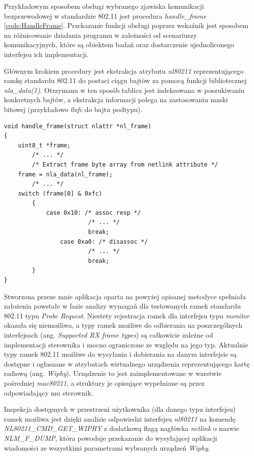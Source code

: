 Przykładowym sposobem obsługi wybranego zjawiska komunikacji bezprzewodowej w standardzie 802.11 jest procedura \emph{handle\_frame} \ref{code:HandleFrame}. Przekazanie funkcji obsługi poprzez wskaźnik jest sposobem na różnicowanie działania programu w zależności od scenariuszy komunikacyjnych, które są obiektem badań oraz dostarczenie ujednoliconego interfejsu ich implementacji. 

Głównym krokiem procedury jest ekstrakcja atrybutu \emph{nl80211} reprezentującego ramkę standardu 802.11 do postaci ciągu bajtów za pomocą funkcji bibliotecznej \emph{nla\_data(1)}. Otrzymana w ten sposób tablica jest indeksowana w poszukiwaniu konkretnych bajtów, a ekstrakcja informacji polega na zastosowaniu maski bitowej (przykładowo \emph{0xfc} do bajtu podtypu). 

\begin{lstlisting}[frame=tb]
void handle_frame(struct nlattr *nl_frame)
{
	uint8_t *frame;
        /* ... */
        /* Extract frame byte array from netlink attribute */
	frame = nla_data(nl_frame);
        /* ... */
	switch (frame[0] & 0xfc) 
        {
	        case 0x10: /* assoc resp */
                        /* ... */
                        break;
                case 0xa0: /* disassoc */
                        /* ... */
                        break;
        }
}
\end{lstlisting}

Stworzona przeze mnie aplikacja oparta na powyżej opisanej metodyce spełniała założenia powstałe w fazie analizy wymagań dla testowanych ramek standardu 802.11 typu \emph{Probe Request}. Niestety rejestracja ramek dla interfejsu typu \emph{monitor} okazała się niemożliwa, a typy ramek możliwe do odbierania na poszczególnych interfejsach (ang. \emph{Supported RX frame types}) są całkowicie zależne od implementacji sterownika i mocno ograniczone ze względu na jego typ. Aktualnie typy ramek 802.11 możliwe do wysyłania i dobierania na danym interfejsie są dostępne i ogłaszane w atrybutach wirtualnego urządzenia reprezentującego kartę radiową (ang. \emph{Wiphy}). Urządzenie to jest zaimplementowane w warstwie pośredniej \emph{mac80211}, a struktury je opisujące wypełniane są przez odpowiadający mu sterownik.

Inspekcja dostępnych w przestrzeni użytkownika (dla danego typu interfejsu) ramek możliwa jest dzięki analizie odpowiedzi interfejsu \emph{nl80211} na komendę \emph{NL80211\_CMD\_GET\_WIPHY} z dodatkową flagą nagłówka \emph{netlink} o nazwie \emph{NLM\_F\_DUMP}, która powoduje przekazanie do wysyłającej aplikacji wiadomości ze wszystkimi parametrami wybranych urządzeń \emph{Wiphy}.

